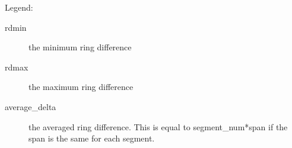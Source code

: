 \documentclass{article}
\begin{document}
Legend: 
\begin{description}
\item[rdmin] the minimum ring difference
\item[rdmax] the maximum ring difference
\item[average\_delta] the averaged ring difference. This is equal 
to segment\_num*span if the span is the same for each segment.
\end{description}
\end{document}
